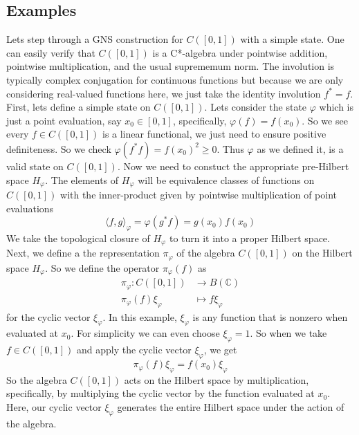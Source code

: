\subsection{Examples}
\begin{example}
Lets step through a GNS construction for \( C([0,1]) \) with a simple state. One
can easily verify that $C([0,1])$ is a C*-algebra under pointwise addition, pointwise
multiplication, and the usual suprememum norm. The involution is typically complex
conjugation for continuous functions but because we are only considering real-valued
functions here, we just take the identity involution $f^*=f$. First, lets define a simple state
on $C([0,1])$. Lets consider the state $\varphi$ which is just a point evaluation,
say $x_0 \in [0,1]$, specifically, $\varphi(f) = f(x_0)$. So we see every $f \in C([0,1])$
is a linear functional, we just need to ensure positive definiteness. So we check
$\varphi(f^*f) = f(x_0)^2 \ge 0$. Thus $\varphi$ as we defined it, is a valid state
on $C([0,1])$. Now we need to constuct the appropriate pre-Hilbert space $H_\varphi$.
The elements of $H_\varphi$ will be equivalence classes of functions on $C([0,1])$
with the inner-product given by pointwise multiplication of point evaluations
\begin{equation}
    \langle f,g \rangle_\varphi = \varphi(g^*f) = g(x_0)f(x_0)
\end{equation}
We take the topological closure of $H_\varphi$ to turn it into a proper Hilbert space.
Next, we define a the representation $\pi_\varphi$ of the algebra $C([0,1])$ on
the Hilbert space $H_\varphi$. So we define the operator $\pi_\varphi (f)$ as
\begin{align}
    \pi_\varphi: C([0,1]) &\to B(\mathbb{C})\\
    \pi_\varphi (f)\xi_\varphi &\mapsto f \xi_\varphi
\end{align}
for the cyclic vector $\xi_\varphi$. In this example, $\xi_\varphi$ is any function
that is nonzero when evaluated at $x_0$. For simplicity we can even choose $\xi_\varphi = 1$.
So when we take $f \in C([0,1])$ and apply the cyclic vector $\xi_\varphi$, we get
\begin{equation}
    \pi_\varphi (f) \xi_\varphi = f(x_0) \xi_\varphi
\end{equation}
So the algebra $C([0,1])$ acts on the Hilbert space by multiplication, specifically,
by multiplying the cyclic vector by the function evaluated at $x_0$. Here, our cyclic
vector $\xi_\varphi$ generates the entire Hilbert space under the action of the algebra.

\end{example}
